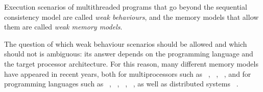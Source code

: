 Execution scenarios of multithreaded programs that go beyond the sequential consistency model are called \emph{weak behaviours}, and the memory models that allow them are called \emph{weak memory models}.

The question of which weak behaviour scenarios should be allowed and which should not is ambiguous: its answer depends on the programming language and the target processor architecture.
For this reason, many different memory models have appeared in recent years, both for multiprocessors such as \Intel~\autocite{Sewell-al:CACM10},
\ARM~\autocite{Pulte-al:POPL18},
\POWER~\autocite{Sarkar-al:PLDI11}, and for programming languages such as
\CPP~\autocite{Batty-al:POPL11},
\Java~\autocite{Manson-al:POPL05},
\JS~\autocite{Watt-al:PLDI2020},
\OCaml~\autocite{Dolan-al:PLDI18},
as well as distributed systems%
~\autocite{Jagadeesan-al:ESOP2018,Lahav-Boker:PLDI2020}.

